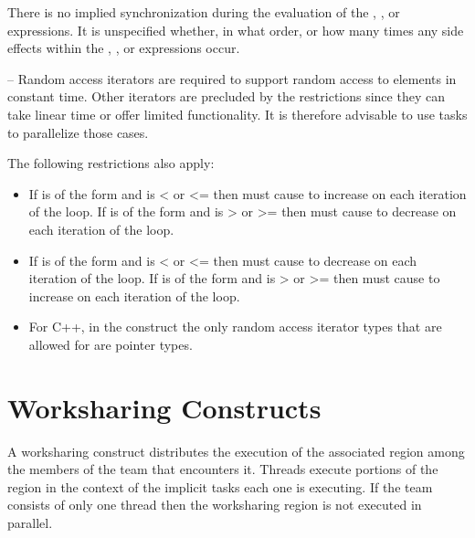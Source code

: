 There is no implied synchronization during the evaluation of the , , or  
expressions. It is unspecified whether, in what order, or how many times any side effects 
within the , , or  expressions occur.

\notestart
\noteheader – Random access iterators are required to support random access to elements in 
constant time. Other iterators are precluded by the restrictions since they can take linear 
time or offer limited functionality. It is therefore advisable to use tasks to parallelize 
those cases. 


\noteend

\restrictions
The following restrictions also apply:

\begin{itemize}
\item If  is of the form   
 and  is < or <= then  must cause  to increase on each 
iteration of the loop. If  is of 
the form    and  
is > or >= then  must cause  to decrease on each iteration of the loop.

\item If  is of the form   
 and  is < or <= then 
 must cause  to decrease on each iteration of the loop. If  is of 
the form    and  
is > or >= then  must cause  to increase on each iteration of the loop.

\item For C++, in the  construct the only random access iterator types that are 
allowed for  are pointer types. 
\end{itemize}
\ccppspecificend










\section{Worksharing Constructs}
\label{sec:Worksharing Constructs}
A worksharing construct distributes the execution of the associated region among the 
members of the team that encounters it. Threads execute portions of the region in the 
context of the implicit tasks each one is executing. If the team consists of only one 
thread then the worksharing region is not executed in parallel.

